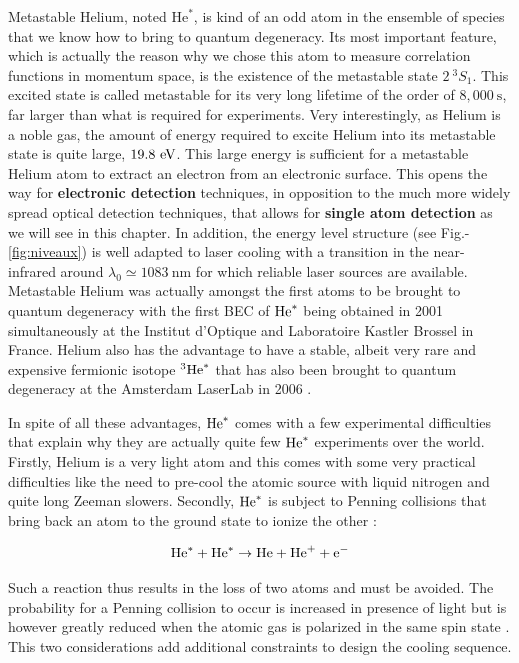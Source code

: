 Metastable Helium, noted $\mathrm{He}^*$, is kind of an odd atom in the ensemble of species that we know how to bring to quantum degeneracy. Its most important feature, which is actually the reason why we chose this atom to measure correlation functions in momentum space, is the existence of the metastable state $2 \ ^3 S_1$. This excited state is called metastable for its very long lifetime of the order of $8,000 \ \mathrm{s}$, far larger than what is required for experiments. Very interestingly, as Helium is a noble gas, the amount of energy required to excite Helium into its metastable state is quite large, $19.8 \ \rm{eV}$. This large energy is sufficient for a metastable Helium atom to extract an electron from an electronic surface. This opens the way for \textbf{electronic detection} techniques, in opposition to the much more widely spread optical detection techniques, that allows for \textbf{single atom detection} as we will see in this chapter. In addition, the energy level structure (see Fig.-\ref{fig:niveaux}) is well adapted to laser cooling with a transition in the near-infrared around $\lambda_0 \simeq 1083 \ \mathrm{nm}$ for which reliable laser sources are available. Metastable Helium was actually amongst the first atoms to be brought to quantum degeneracy with the first BEC of $\mathrm{He}^*$ being obtained in 2001 simultaneously at the Institut d'Optique \cite{robert2001bose} and Laboratoire Kastler Brossel \cite{dos2001bose} in France. Helium also has the advantage to have a stable, albeit very rare and expensive fermionic isotope $^3 \mathrm{He}^*$ that has also been brought to quantum degeneracy at the Amsterdam LaserLab in 2006 \cite{mcnamara2006degenerate}.

In spite of all these advantages, $\mathrm{He}^*$ comes with a few experimental difficulties that explain why they are actually quite few $\mathrm{He}^*$ experiments over the world. Firstly, Helium is a very light atom and this comes with some very practical difficulties like the need to pre-cool the atomic source with liquid nitrogen and quite long Zeeman slowers. Secondly, $\mathrm{He}^*$ is subject to Penning collisions that bring back an atom to the ground state to ionize the other \cite{dos2001penning}:

\begin{equation}
    \mathrm{He}^* + \mathrm{He}^* \rightarrow \mathrm{He} + \mathrm{He}^+ + \mathrm{e}^{-}
\end{equation}

\noindent Such a reaction thus results in the loss of two atoms and must be avoided. The probability for a Penning collision to occur is increased in presence of light \cite{bardou1992magneto} but is however greatly reduced when the atomic gas is polarized in the same spin state \cite{fedichev1996inelastic}. This two considerations add additional constraints to design the cooling sequence.




